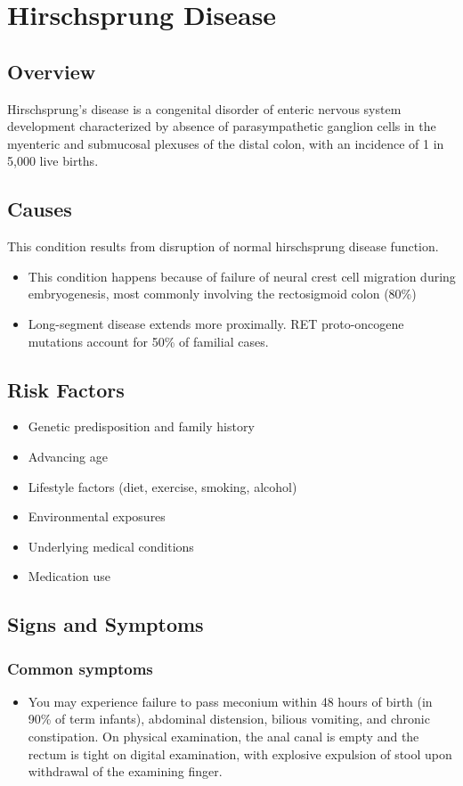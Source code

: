 \chapter{Hirschsprung Disease}
\label{sec:Hirschsprung Disease}

\section{Overview}
Hirschsprung's disease is a congenital disorder of enteric nervous system development characterized by absence of parasympathetic ganglion cells in the myenteric and submucosal plexuses of the distal colon, with an incidence of 1 in 5,000 live births.
\section{Causes}
This condition results from disruption of normal hirschsprung disease function.

\begin{itemize}[noitemsep]
  \item This condition happens because of failure of neural crest cell migration during embryogenesis, most commonly involving the rectosigmoid colon (80\%)
  \item Long-segment disease extends more proximally. RET proto-oncogene mutations account for 50\% of familial cases.
\end{itemize}
\section{Risk Factors}


\begin{itemize}[noitemsep]
  \item Genetic predisposition and family history
  \item Advancing age
  \item Lifestyle factors (diet, exercise, smoking, alcohol)
  \item Environmental exposures
  \item Underlying medical conditions
  \item Medication use
\end{itemize}
\section{Signs and Symptoms}

\subsection{Common symptoms}
\begin{itemize}[noitemsep]
  \item You may experience failure to pass meconium within 48 hours of birth (in 90\% of term infants), abdominal distension, bilious vomiting, and chronic constipation. On physical examination, the anal canal is empty and the rectum is tight on digital examination, with explosive expulsion of stool upon withdrawal of the examining finger. 
  \end{itemize}

